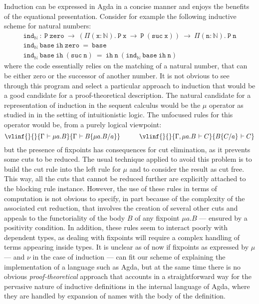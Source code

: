 \documentclass[creativecommons]{eptcs/eptcs}
\newcommand{\rnm}[1]{\textbf{\textit{#1}}}
\newcommand{\gseq}[2]{{#1 \hspace*{1pt}\vdash #2}}
\newcommand{\msub}[1]{\{#1\}}
\newcommand{\imp}[0]{\rightarrow\xspace}
\newcommand{\irule}[3]{
  \vlinf{\rnm{#1}}{}{#2}{#3}}
\newcommand{\gseqrule}[5]{
  \irule{#1}{\gseq{#2}{#3}}{\gseq{#4}{#5}}}
\begin{document}
Induction can be expressed in Agda in a concise manner and enjoys the
benefits of the equational presentation. Consider for example the
following inductive scheme for natural numbers:
$$\begin{array}{l}
  \mathtt{ind_\mathbb{N}~:~P~zero~\imp~(\Pi(x:
    \mathbb{N}).~P~x~\imp~P~(suc~x))~\imp~\Pi(n:\mathbb{N}).~P~n}\\
  \mathtt{ind_\mathbb{N}~base~ih~zero~=~base} \\
  \mathtt{ind_\mathbb{N}~base~ih~(suc~n)~=~ih~n~(ind_\mathbb{N}~base~ih~n)}
\end{array}$$
where the code essentially relies on the matching of a natural
number, that can be either zero or the successor of another number.
It is not obvious to see through this program and select a particular
approach to induction that would be a good candidate for a proof-theoretical
description. The natural candidate for a representation of induction in
the sequent calculus would be the $\mu$ operator as studied in
\cite{baelde:phd} in the setting of intuitionistic logic. The unfocused
rules for this operator would be, from a purely logical viewpoint:
$$\gseqrule{}{\Gamma}{\mu a.B}{\Gamma}{B\msub{\mu a.B/a}}
  \qquad\quad
  \gseqrule{}{\Gamma,\mu a.B}{C}{B\msub{C/a}}{C}$$
but the presence of fixpoints has consequences for cut elimination,
as it prevents some cuts to be reduced. The usual technique applied
to avoid this problem is to build the cut rule into the left rule
for $\mu$ and to consider the result as cut free. This way, all the
cuts that cannot be reduced further are explicitly attached to the
blocking rule instance. However, the use of these rules in terms
of computation is not obvious to specify, in part because of the
complexity of the associated cut reduction, that involves the
creation of several other cuts and appeals to the functoriality
of the body $B$ of any fixpoint $\mu a.B$ --- ensured by a positivity
condition. In addition, these rules seem to interact poorly with
dependent types, as dealing with fixpoints will require a complex
handling of terms appearing inside types. It is unclear as of now
if fixpoints as expressed by $\mu$ --- and $\nu$ in the case of
induction --- can fit our scheme of explaining the implementation
of a language such as Agda, but at the same time there is no
obvious \emph{proof-theoretical} approach that accounts in a
straightforward way for the pervasive nature of inductive definitions
in the internal language of Agda, where they are handled by expansion
of names with the body of the definition.
\end{document}
